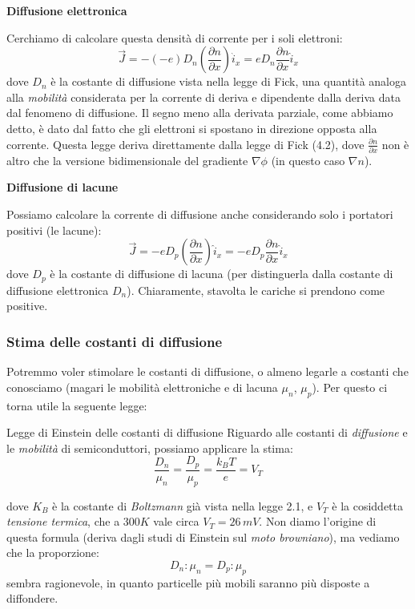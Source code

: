\documentclass[a4paper,11pt]{article}
\begin{document}
\par\smallskip

\noindent
\textbf{\textsf{Diffusione elettronica}}

\noindent
Cerchiamo di calcolare questa densità di corrente per i soli elettroni:
$$
\vec{J} = - (-e) D_n \left(\frac{\partial n}{\partial x} \right) \hat{i}_x = e D_n \frac{\partial n}{\partial x} \hat{i}_x 
$$
dove $D_n$ è la costante di diffusione vista nella legge di Fick, una quantità analoga alla \textit{mobilità} considerata per la corrente di deriva e dipendente dalla deriva data dal fenomeno di diffusione. Il segno meno alla derivata parziale, come abbiamo detto, è dato dal fatto che gli elettroni si spostano in direzione opposta alla corrente. Questa legge deriva direttamente dalla legge di Fick (4.2), dove $\frac{\partial n}{\partial x}$ non è altro che la versione bidimensionale del gradiente $\nabla \phi$ (in questo caso $\nabla n$).

\par\smallskip

\noindent
\textbf{\textsf{Diffusione di lacune}}

\noindent
Possiamo calcolare la corrente di diffusione anche considerando solo i portatori positivi (le lacune):
$$
\vec{J} = - e D_p \left(\frac{\partial n}{\partial x} \right) \hat{i}_x = - e D_p \frac{\partial n}{\partial x} \hat{i}_x 
$$
dove $D_p$ è la costante di diffusione di lacuna (per distinguerla dalla costante di diffusione elettronica $D_n$). Chiaramente, stavolta le cariche si prendono come positive.

\subsubsection{Stima delle costanti di diffusione}

Potremmo voler stimolare le costanti di diffusione, o almeno legarle a costanti che conosciamo (magari le mobilità elettroniche e di lacuna $\mu_n$, $\mu_p$). Per questo ci torna utile la seguente legge:
\begin{definition}{Legge di Einstein delle costanti di diffusione}
	Riguardo alle costanti di \textit{diffusione} e le \textit{mobilità} di semiconduttori, possiamo applicare la stima:
	$$
		\frac{D_n}{\mu_n} = \frac{D_p}{\mu_p} = \frac{k_B T}{e} = V_T 
	$$
\end{definition}
dove $K_B$ è la costante di \textit{Boltzmann} già vista nella legge 2.1, e $V_T$ è la cosiddetta \textit{tensione termica}, che a $300 K$ vale circa $V_T = 26 \, m V$. Non diamo l'origine di questa formula (deriva dagli studi di Einstein sul \textit{moto browniano}), ma vediamo che la proporzione:
$$
D_n : \mu_n = D_p : \mu_p
$$
sembra ragionevole, in quanto particelle più mobili saranno più disposte a diffondere.
\end{document}
